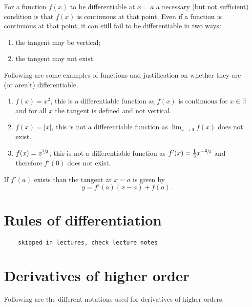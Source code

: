For a function $f(x)$ to be differentiable at $x=a$ a necessary (but not sufficient) condition is that $f(x)$ is continuous at that point. Even if a function is continuous at that point, it can still fail to be differentiable in two ways:

\begin{enumerate}
    \item the tangent may be vertical;
    \item the tangent may not exist.
\end{enumerate}

\begin{example}
    Following are some examples of functions and justification on whether they are (or aren't) differentiable.
    \begin{enumerate}
        \item $f(x)=x^2$, this is a differentiable function as $f(x)$ is continuous for $x\in\mathbb R$ and for all $x$ the tangent is defined and not vertical.
        
        \item $f(x)=|x|$, this is not a differentiable function as $\lim_{x\to0}f(x)$ does not exist.
        
        \item $f(x)=x^{\sfrac13}$, this is not a differentiable function as $f'(x)=\frac13x^{-\sfrac23}$ and therefore $f'(0)$ does not exist.
    \end{enumerate}
\end{example}

\begin{remark}
    If $f'(a)$ exists than the tangent at $x=a$ is given by \[y=f'(a)(x-a)+f(a).\]
\end{remark}

\section{Rules of differentiation}

\begin{verbatim}
    skipped in lectures, check lecture notes
\end{verbatim}

\section{Derivatives of higher order}

Following are the different notations used for derivatives of higher orders.

